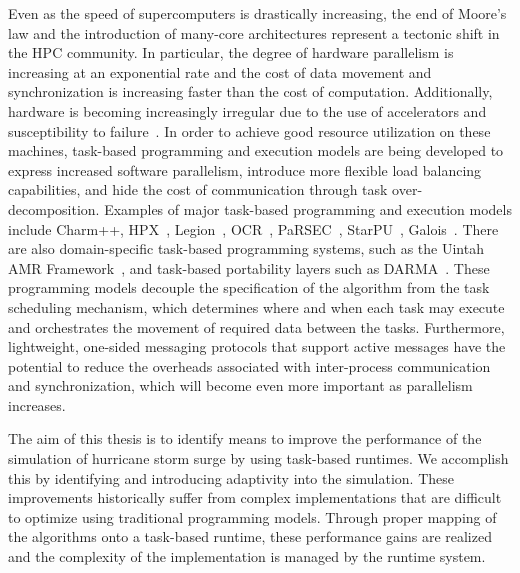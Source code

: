 Even as the speed of supercomputers is drastically increasing, the end of Moore's law and the introduction of many-core architectures represent a tectonic shift in the HPC community.
In particular, the degree of hardware parallelism is increasing at an exponential rate and the cost of data movement and synchronization is increasing faster than the cost of computation. Additionally, hardware is becoming increasingly irregular due to the use of accelerators and susceptibility to failure~\cite{Kogge2013}.
In order to achieve good resource utilization on these machines, task-based programming and execution models are being developed to express increased software parallelism, introduce more flexible load balancing capabilities, and hide the cost of communication through task over-decomposition. 
Examples of major task-based programming and execution models include Charm++, HPX~\cite{hpx2}, Legion~\cite{legion}, OCR~\cite{ocr}, PaRSEC~\cite{parsec}, StarPU~\cite{starpu}, Galois~\cite{Kulkarni2007, Pingali2011}.
There are also domain-specific task-based programming systems, such as the Uintah AMR Framework~\cite{uintah}, and task-based portability layers such as DARMA~\cite{darma}.
These programming models decouple the specification of the algorithm from the task scheduling mechanism, which determines where and when each task may execute and orchestrates the movement of required data between the tasks.
Furthermore, lightweight, one-sided messaging protocols that support active messages have the potential to reduce the overheads associated with inter-process communication and synchronization, which will become even more important as parallelism increases.

The aim of this thesis is to identify means to improve the performance of the simulation of hurricane storm surge by using task-based runtimes. We accomplish this by identifying and introducing adaptivity into the simulation. These improvements historically suffer from complex implementations that are difficult to optimize using traditional programming models. Through proper mapping of the algorithms onto a task-based runtime, these performance gains are realized and the complexity of the implementation is managed by the runtime system.





%